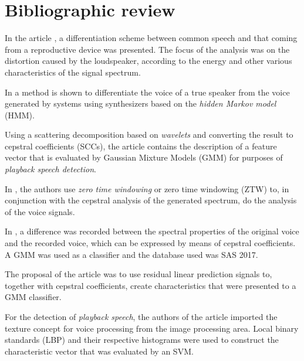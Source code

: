 \section{Bibliographic review}
\label{sec:revBibli}

	\par In the article \cite{Ren2019}, a differentiation scheme between common speech and that coming from a reproductive device was presented. The focus of the analysis was on the distortion caused by the loudspeaker, according to the energy and other various characteristics of the signal spectrum.

	\par In \cite{DiqunYan2019} a method is shown to differentiate the voice of a true speaker from the voice generated by systems using synthesizers based on the \textit{hidden Markov model} (HMM).
		
	\par Using a scattering decomposition based on \textit {wavelets} and converting the result to cepstral coefficients (SCCs), the article \cite{7802552} contains the description of a feature vector that is evaluated by Gaussian Mixture Models (GMM) for purposes of \textit{playback speech detection}.	

	\par In \cite{alluri2019replay}, the authors use \textit{zero time windowing} or zero time windowing (ZTW) to, in conjunction with the cepstral analysis of the generated spectrum, do the analysis of the voice signals.	

	\par In \cite{8725688}, a difference was recorded between the spectral properties of the original voice and the recorded voice, which can be expressed by means of cepstral coefficients. A GMM was used as a classifier and the database used was SAS 2017.

	\par The proposal of the article \cite{Hanilci2018} was to use residual linear prediction signals to, together with cepstral coefficients, create characteristics that were presented to a GMM classifier.	

	\par For the detection of \textit{playback speech}, the authors of the article \cite{ISI:000473343500086} imported the texture concept for voice processing from the image processing area. Local binary standards (LBP) and their respective histograms were used to construct the characteristic vector that was evaluated by an SVM.
	
